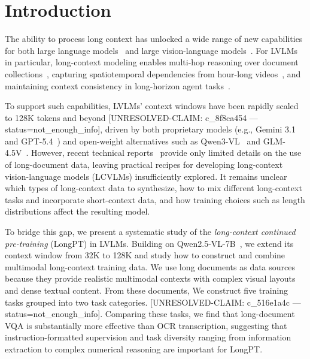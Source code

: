
\section{Introduction}
\label{sec:introduction}
The ability to process long context has unlocked a wide range of new capabilities for both large language models~\citep[LLMs;][]{yang2025qwen3,llama4} and large vision-language models~\citep[LVLMs;][]{bai2025qwen3,seed2_0}.
For LVLMs in particular, long-context modeling enables multi-hop reasoning over document collections~\citep{wang2025mmlongbench,wang2024multimodal}, capturing spatiotemporal dependencies from hour-long videos~\citep{wu2024longvideobench,fu2025video}, and maintaining context consistency in long-horizon agent tasks~\citep{geng2025webwatcher,zhang2026browsecomp,zhang2026clawbench}.

To support such capabilities, LVLMs' context windows have been rapidly scaled to 128K tokens and beyond [UNRESOLVED-CLAIM: c_8f8ca454 — status=not_enough_info], driven by both proprietary models (e.g., Gemini 3.1~\citep{gemini_3_1_pro_2026} and GPT-5.4~\citep{openai2026introducing_gpt5_4}) and open-weight alternatives such as Qwen3-VL~\citep{bai2025qwen3} and GLM-4.5V~\citep{hong2025glm}.
However, recent technical reports~\citep{bai2025qwen3,hong2025glm} provide only limited details on the use of long-document data, leaving practical recipes for developing long-context vision-language models (LCVLMs) insufficiently explored.
It remains unclear which types of long-context data to synthesize, how to mix different long-context tasks and incorporate short-context data, and how training choices such as length distributions affect the resulting model.

To bridge this gap, we present a systematic study of the \emph{long-context continued pre-training} (LongPT) in LVLMs.
Building on Qwen2.5-VL-7B~\citep{bai2025qwen2}, we extend its context window from 32K to 128K and study how to construct and combine multimodal long-context training data.
We use long documents as data sources because they provide realistic multimodal contexts with complex visual layouts and dense textual content.
From these documents, We construct five training tasks grouped into two task categories. [UNRESOLVED-CLAIM: c_516e1a4c — status=not_enough_info].
Comparing these tasks, we find that long-document VQA is substantially more effective than OCR transcription, suggesting that instruction-formatted supervision and task diversity ranging from information extraction to complex numerical reasoning are important for LongPT.

